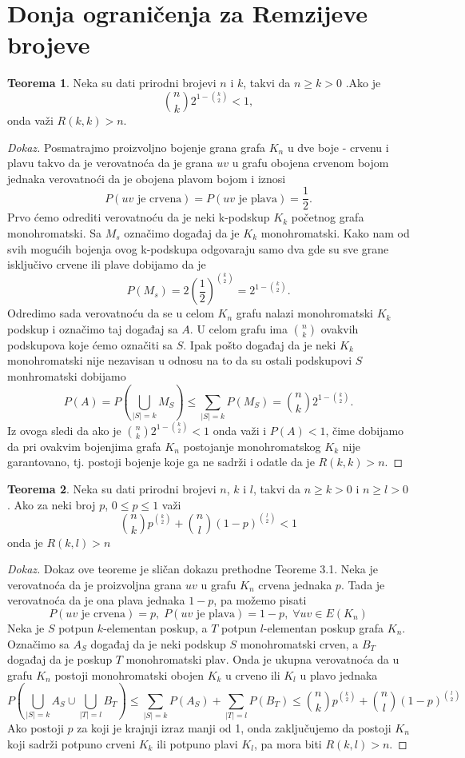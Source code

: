 \documentclass{article}
\theoremstyle{definition}
\newtheorem{teorema}{Teorema}[section]
\newcommand{\dokaz}[1]{\begin{proof}[Dokaz]#1\end{proof}}
\begin{document}
	\section{Donja ograničenja za Remzijeve brojeve}
	\begin{teorema}\label{dot1}
	Neka su dati prirodni brojevi $n$ i $k$, takvi da $n \geq{k} > 0$ .Ako je $$\binom{n}{k}2^{1 - \binom{k}{2}} < 1 ,$$  onda važi $R(k, k) > n$.
	\dokaz{
		Posmatrajmo proizvoljno bojenje grana grafa $K_n$ u dve boje - crvenu i plavu takvo da je verovatnoća da je grana $uv$ u grafu obojena crvenom bojom jednaka verovatnoći da je 		           obojena plavom bojom i iznosi 
		$$P(uv \text{ je crvena}) = P(uv \text{ je plava}) = \frac{1}{2}.$$
		\newline
		Prvo ćemo odrediti verovatnoću da je neki k-podskup $K_k$ početnog grafa monohromatski. 
		Sa $M_s$ označimo događaj da je $K_k$ monohromatski. Kako nam od svih mogućih bojenja ovog k-podskupa odgovaraju samo dva gde su sve grane isključivo crvene ili plave dobijamo
		da je
		$$P(M_s) = 2\left(\frac{1}{2}\right)^{\binom{k}{2}} = 2 ^ {1 - \binom{k}{2}}.$$
		Odredimo sada verovatnoću da se u celom $K_n$ grafu nalazi monohromatski $K_k$ podskup i označimo taj događaj sa $A$. U celom grafu ima $\binom{n}{k}$ ovakvih podskupova koje 			ćemo označiti sa $S$. Ipak pošto događaj da je neki $K_k$ monohromatski nije nezavisan u odnosu na to da su ostali podskupovi $S$ monhromatski dobijamo 
		$$P(A) = P(\bigcup_{|S|=k}M_S) \leq{\sum_{|S|=k}P(M_S)} = \binom{n}{k} 2 ^ {1 - \binom{k}{2}}.$$
		Iz ovoga sledi da ako je $\binom{n}{k} 2 ^ {1 - \binom{k}{2}} < 1$ onda važi i $P(A) < 1$, čime dobijamo da pri ovakvim bojenjima grafa $K_n$ postojanje monohromatskog 
		$K_k$ nije garantovano, tj. postoji bojenje koje ga ne sadrži i odatle da je $R(k,k) > n$.
	}
	\end{teorema}
	\begin{teorema}\label{dot2}
	Neka su dati prirodni brojevi $n$, $k$ i $l$, takvi da $n \geq{k} > 0$ i $n \geq{l} > 0$. Ako za neki broj $p$, $0 \leq{p} \leq 1$ važi
	$$\binom{n}{k}p^{\binom{k}{2}} + \binom{n}{l}(1 - p)^{\binom{l}{2}} < 1$$ onda je $R(k,l) > n$
	\dokaz{
		Dokaz ove teoreme je sličan dokazu prethodne Teoreme 3.1. Neka je verovatnoća da je proizvoljna grana $uv$ u grafu $K_n$ crvena jednaka $p$. Tada je verovatnoća da je ona               	plava jednaka $1 - p$, pa možemo pisati 
		$$P(uv \text{ je crvena}) = p,\; P(uv \text{ je plava}) = 1 - p, \; \forall uv \in E(K_n)$$
		Neka je $S$ potpun $k$-elementan poskup, a $T$ potpun $l$-elementan poskup grafa $K_n$. Označimo sa $A_S$ događaj da je neki podskup $S$ monohromatski crven, a $B_T$ događaj  	da je poskup $T$ monohromatski plav. Onda je ukupna verovatnoća da u grafu $K_n$ postoji monohromatski obojen $K_k$ u crveno ili $K_l$ u plavo jednaka
		$$P\left(\bigcup_{|S|=k}A_S \cup \bigcup_{|T|=l}B_T \right) \leq \sum_{|S|=k}P(A_S) + \sum_{|T|=l}P(B_T) \leq \binom{n}{k}p^{\binom{k}{2}} + \binom{n}{l}(1 - p)^{\binom{l}{2}}$$
		Ako postoji $p$ za koji je krajnji izraz manji od 1, onda zaključujemo da postoji $K_n$  koji sadrži potpuno crveni $K_k$ ili potpuno plavi $K_l$, pa mora biti $R(k,l)>n$.
	}
	\end{teorema}
\end{document}
